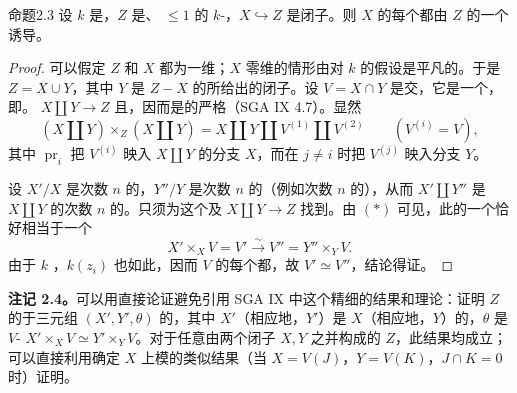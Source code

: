 \begin{SGAresult}{命题}{2.3}
设 $k$ 是，$Z$ 是、 $\leq1$ 的 $k$-，$X\hookrightarrow Z$ 是闭子。则 $X$ 的每个都由 $Z$ 的一个诱导。
\end{SGAresult}
\begin{proof}
可以假定 $Z$ 和 $X$ 都为一维；$X$ 零维的情形由对 $k$ 的假设是平凡的。于是 $Z=X\cup Y$，其中 $Y$ 是 $Z-X$ 的所给出的闭子。设 $V=X\cap Y$ 是交，它是一个，即。 $X\amalg Y\to Z$ 且，因而是的严格（SGA IX 4.7）。显然
\[
(X\amalg Y)\times_Z(X\amalg Y)=X\amalg Y\amalg V^{(1)}\amalg V^{(2)}\qquad(V^{(i)}=V),\tag{*}
\]
其中 $\operatorname{pr}_i$ 把 $V^{(i)}$ 映入 $X\amalg Y$ 的分支 $X$，而在 $j\ne i$ 时把 $V^{(j)}$ 映入分支 $Y$。

设 $X'/X$ 是次数 $n$ 的，$Y''/Y$ 是次数 $n$ 的（例如次数 $n$ 的），从而 $X'\amalg Y''$ 是 $X\amalg Y$ 的次数 $n$ 的。只须为这个及 $X\amalg Y\to Z$ 找到。由 $(*)$ 可见，此的一个恰好相当于一个
\[
X'\times_X V=V'\xrightarrow{\sim}V''=Y''\times_Y V.
\]
由于 $k$ ，$k(z_i)$ 也如此，因而 $V$ 的每个都，故 $V'\simeq V''$，结论得证。
\end{proof}
\textbf{注记 2.4。}可以用直接论证避免引用 SGA IX 中这个精细的结果和理论：证明 $Z$ 的于三元组 $(X',Y',\theta)$ 的，其中 $X'$（相应地，$Y'$）是 $X$（相应地，$Y$）的，$\theta$ 是 $V$- $X'\times_X V\simeq Y'\times_Y V$。对于任意由两个闭子 $X,Y$ 之并构成的 $Z$，此结果均成立；可以直接利用确定 $X$ 上模的类似结果（当 $X=V(J)$，$Y=V(K)$，$J\cap K=0$ 时）证明。

